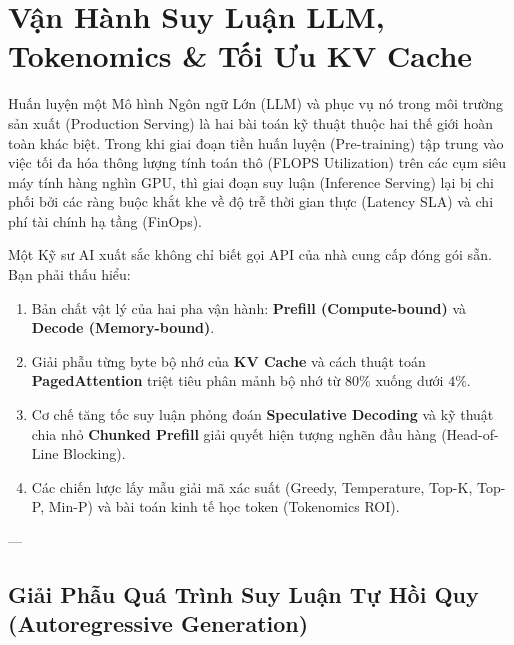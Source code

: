 
\chapter{Vận Hành Suy Luận LLM, Tokenomics \& Tối Ưu KV Cache}
\label{ch:llm-runtime-tokenomics}

Huấn luyện một Mô hình Ngôn ngữ Lớn (LLM) và phục vụ nó trong môi trường sản xuất (Production Serving) là hai bài toán kỹ thuật thuộc hai thế giới hoàn toàn khác biệt. Trong khi giai đoạn tiền huấn luyện (Pre-training) tập trung vào việc tối đa hóa thông lượng tính toán thô (FLOPS Utilization) trên các cụm siêu máy tính hàng nghìn GPU, thì giai đoạn suy luận (Inference Serving) lại bị chi phối bởi các ràng buộc khắt khe về độ trễ thời gian thực (Latency SLA) và chi phí tài chính hạ tầng (FinOps).

Một Kỹ sư AI xuất sắc không chỉ biết gọi API của nhà cung cấp đóng gói sẵn. Bạn phải thấu hiểu:
\begin{enumerate}
  \item Bản chất vật lý của hai pha vận hành: \textbf{Prefill (Compute-bound)} và \textbf{Decode (Memory-bound)}.
  \item Giải phẫu từng byte bộ nhớ của \textbf{KV Cache} và cách thuật toán \textbf{PagedAttention} triệt tiêu phân mảnh bộ nhớ từ $80\%$ xuống dưới $4\%$.
  \item Cơ chế tăng tốc suy luận phỏng đoán \textbf{Speculative Decoding} và kỹ thuật chia nhỏ \textbf{Chunked Prefill} giải quyết hiện tượng nghẽn đầu hàng (Head-of-Line Blocking).
  \item Các chiến lược lấy mẫu giải mã xác suất (Greedy, Temperature, Top-K, Top-P, Min-P) và bài toán kinh tế học token (Tokenomics ROI).
\end{enumerate}

---

\section{Giải Phẫu Quá Trình Suy Luận Tự Hồi Quy (Autoregressive Generation)}
\label{sec:autoregressive-anatomy}

